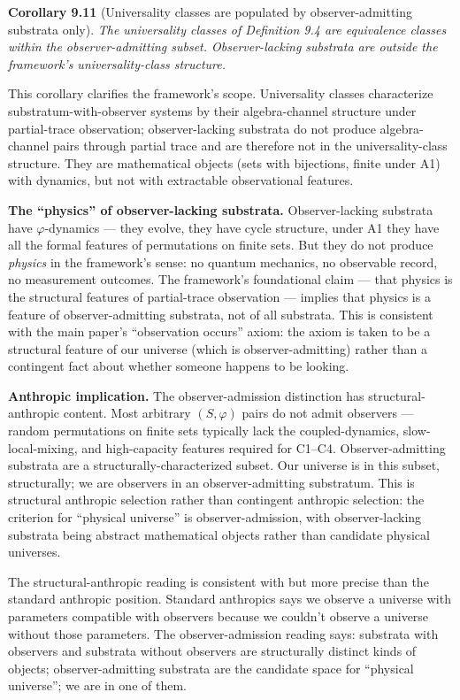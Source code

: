 \documentclass[
]{article}
\begin{document}
\textbf{Corollary 9.11} (Universality classes are populated by
observer-admitting substrata only). \emph{The universality classes of
Definition 9.4 are equivalence classes within the observer-admitting
subset. Observer-lacking substrata are outside the framework's
universality-class structure.}

This corollary clarifies the framework's scope. Universality classes
characterize substratum-with-observer systems by their algebra-channel
structure under partial-trace observation; observer-lacking substrata do
not produce algebra-channel pairs through partial trace and are
therefore not in the universality-class structure. They are mathematical
objects (sets with bijections, finite under A1) with dynamics, but not
with extractable observational features.

\textbf{The ``physics'' of observer-lacking substrata.} Observer-lacking
substrata have \(\varphi\)-dynamics --- they evolve, they have cycle
structure, under A1 they have all the formal features of permutations on
finite sets. But they do not produce \emph{physics} in the framework's
sense: no quantum mechanics, no observable record, no measurement
outcomes. The framework's foundational claim --- that physics is the
structural features of partial-trace observation --- implies that
physics is a feature of observer-admitting substrata, not of all
substrata. This is consistent with the main paper's ``observation
occurs'' axiom: the axiom is taken to be a structural feature of our
universe (which is observer-admitting) rather than a contingent fact
about whether someone happens to be looking.

\textbf{Anthropic implication.} The observer-admission distinction has
structural-anthropic content. Most arbitrary \((S, \varphi)\) pairs do
not admit observers --- random permutations on finite sets typically
lack the coupled-dynamics, slow-local-mixing, and high-capacity features
required for C1--C4. Observer-admitting substrata are a
structurally-characterized subset. Our universe is in this subset,
structurally; we are observers in an observer-admitting substratum. This
is structural anthropic selection rather than contingent anthropic
selection: the criterion for ``physical universe'' is
observer-admission, with observer-lacking substrata being abstract
mathematical objects rather than candidate physical universes.

The structural-anthropic reading is consistent with but more precise
than the standard anthropic position. Standard anthropics says we
observe a universe with parameters compatible with observers because we
couldn't observe a universe without those parameters. The
observer-admission reading says: substrata with observers and substrata
without observers are structurally distinct kinds of objects;
observer-admitting substrata are the candidate space for ``physical
universe''; we are in one of them.
\end{document}
